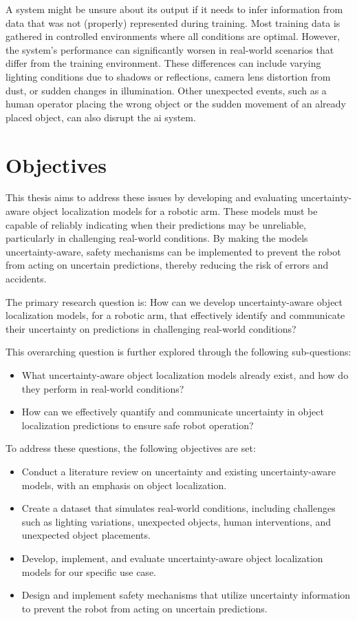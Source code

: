 A system might be unsure about its output if it needs to infer information from data that was not (properly) represented during training.
Most training data is gathered in controlled environments where all conditions are optimal.
However, the system's performance can significantly worsen in real-world scenarios that differ from the training environment.
These differences can include varying lighting conditions due to shadows or reflections, camera lens distortion from dust, or sudden changes in illumination.
Other unexpected events, such as a human operator placing the wrong object or the sudden movement of an already placed object, can also disrupt the \gls{ai} system.

\section{Objectives} \label{ch:introduction_section:objectives}
This thesis aims to address these issues by developing and evaluating uncertainty-aware object localization models for a robotic arm.
These models must be capable of reliably indicating when their predictions may be unreliable, particularly in challenging real-world conditions.
By making the models uncertainty-aware, safety mechanisms can be implemented to prevent the robot from acting on uncertain predictions, thereby reducing the risk of errors and accidents.

The primary research question is:
How can we develop uncertainty-aware object localization models, for a robotic arm, that effectively identify and communicate their uncertainty on predictions in challenging real-world conditions?

This overarching question is further explored through the following sub-questions:
\begin{itemize}
    \item What uncertainty-aware object localization models already exist, and how do they perform in real-world conditions?
    \item How can we effectively quantify and communicate uncertainty in object localization predictions to ensure safe robot operation?
\end{itemize}

To address these questions, the following objectives are set:
\begin{itemize}
    \item Conduct a literature review on uncertainty and existing uncertainty-aware models, with an emphasis on object localization.
    \item Create a dataset that simulates real-world conditions, including challenges such as lighting variations, unexpected objects, human interventions, and unexpected object placements.
    \item Develop, implement, and evaluate uncertainty-aware object localization models for our specific use case.
    \item Design and implement safety mechanisms that utilize uncertainty information to prevent the robot from acting on uncertain predictions.
\end{itemize}